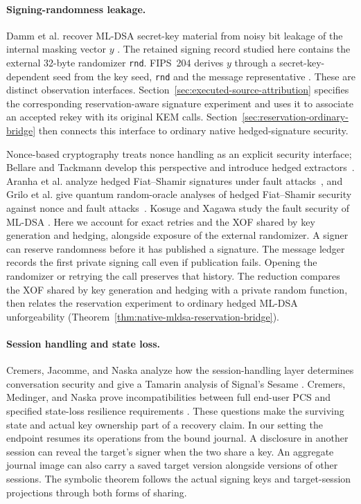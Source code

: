 \documentclass[pdflatex]{sn-jnl}
\theoremstyle{thmstyleone}
\theoremstyle{thmstylethree}
\theoremstyle{thmstyletwo}
\begin{document}
\paragraph{Signing-randomness leakage.}
Damm et al. recover ML-DSA secret-key material from noisy bit leakage of
the internal masking vector $y$ \cite{damm2026}. The retained signing
record studied here contains the external 32-byte randomizer
\texttt{rnd}. FIPS~204 derives $y$ through a secret-key-dependent seed
from the key seed, \texttt{rnd} and the message representative
\cite[Algorithm~7]{fips204}. These are distinct observation interfaces.
Section~\ref{sec:executed-source-attribution} specifies the corresponding
reservation-aware signature experiment and uses it to associate an accepted
rekey with its original KEM calls. Section~\ref{sec:reservation-ordinary-bridge}
then connects this interface to ordinary native hedged-signature security.

Nonce-based cryptography treats nonce handling as an explicit security
interface; Bellare and Tackmann develop this perspective and introduce
hedged extractors~\cite{bellare2016nonce}. Aranha et al. analyze hedged
Fiat--Shamir signatures under fault attacks~\cite{aranha2020hedged}, and
Grilo et al. give quantum random-oracle analyses of hedged Fiat--Shamir
security against nonce and fault attacks~\cite{grilo2021reprogramming}.
Kosuge and Xagawa study the fault security of ML-DSA
\cite{kosuge2025mldsa}.
Here we account for exact retries and the XOF shared by key generation
and hedging, alongside exposure of the external randomizer. A signer can
reserve randomness before it has published a signature. The message ledger
records the first private signing call
even if publication fails. Opening the randomizer or retrying the call
preserves that history. The reduction compares the XOF shared by key
generation and hedging with a private random function, then relates the
reservation experiment to ordinary hedged ML-DSA unforgeability
(Theorem~\ref{thm:native-mldsa-reservation-bridge}).

\paragraph{Session handling and state loss.}
Cremers, Jacomme, and Naska analyze how the session-handling layer determines
conversation security and give a Tamarin analysis of Signal's Sesame
\cite{sessionhandling2023}. Cremers, Medinger, and Naska prove incompatibilities
between full end-user PCS and specified state-loss resilience requirements
\cite{stateloss2025}. These questions make the surviving state and actual
key ownership part of a recovery claim. In our setting the endpoint
resumes its operations from the bound journal. A disclosure in another
session can reveal the target's signer when the two share a key. An
aggregate journal image can also carry a saved target version alongside
versions of other sessions. The symbolic theorem follows the actual
signing keys and target-session projections through both forms of sharing.
\end{document}
